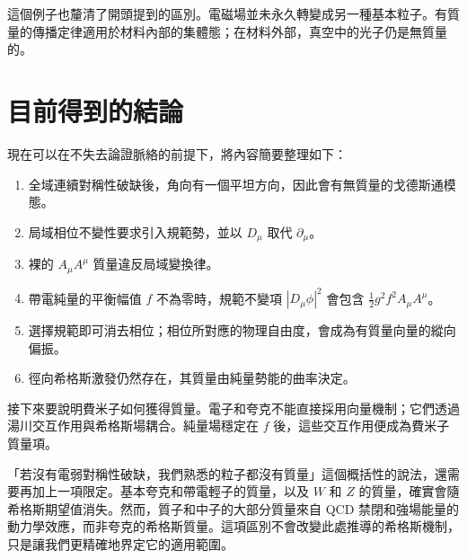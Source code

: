 這個例子也釐清了開頭提到的區別。電磁場並未永久轉變成另一種基本粒子。有質量的傳播定律適用於材料內部的集體態；在材料外部，真空中的光子仍是無質量的。

\section{目前得到的結論}

現在可以在不失去論證脈絡的前提下，將內容簡要整理如下：
\begin{enumerate}
  \item 全域連續對稱性破缺後，角向有一個平坦方向，因此會有無質量的戈德斯通模態。
  \item 局域相位不變性要求引入規範勢，並以 \(D_\mu\) 取代 \(\partial_\mu\)。
  \item 裸的 \(A_\mu A^\mu\) 質量違反局域變換律。
  \item 帶電純量的平衡幅值 \(f\) 不為零時，規範不變項 \(|D_\mu\phi|^2\) 會包含 \(\frac12g^2f^2A_\mu A^\mu\)。
  \item 選擇規範即可消去相位；相位所對應的物理自由度，會成為有質量向量的縱向偏振。
  \item 徑向希格斯激發仍然存在，其質量由純量勢能的曲率決定。
\end{enumerate}

接下來要說明費米子如何獲得質量。電子和夸克不能直接採用向量機制；它們透過湯川交互作用與希格斯場耦合。純量場穩定在 \(f\) 後，這些交互作用便成為費米子質量項。

「若沒有電弱對稱性破缺，我們熟悉的粒子都沒有質量」這個概括性的說法，還需要再加上一項限定。基本夸克和帶電輕子的質量，以及 \(W\) 和 \(Z\) 的質量，確實會隨希格斯期望值消失。然而，質子和中子的大部分質量來自 QCD 禁閉和強場能量的動力學效應，而非夸克的希格斯質量。這項區別不會改變此處推導的希格斯機制，只是讓我們更精確地界定它的適用範圍。
